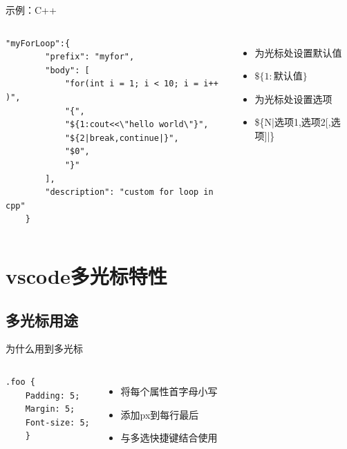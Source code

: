 \documentclass{beamer}
\begin{document}
\begin{frame}[fragile]{示例：C++}
    \begin{columns}

        \begin{lstlisting}[language=Tex,basicstyle=\tiny]
    "myForLoop":{
        "prefix": "myfor",
        "body": [
            "for(int i = 1; i < 10; i = i++ )",
            "{",
            "${1:cout<<\"hello world\"}",
            "${2|break,continue|}",
            "$0",
            "}"
        ],
        "description": "custom for loop in cpp"
    }
    \end{lstlisting}
        \begin{itemize}
            \item 为光标处设置默认值
            \item $\$\{1:\text{默认值}\}$
            \item 为光标处设置选项
            \item \$\{N|选项1,选项2[,选项]|\}
        \end{itemize}
    \end{columns}
\end{frame}

\section{vscode多光标特性}
\subsection{多光标用途}

\begin{frame}[fragile]{为什么用到多光标}
    \begin{columns}

        \begin{lstlisting}[language=Html,basicstyle=\small]
.foo {
    Padding: 5;
    Margin: 5;
    Font-size: 5;
    }
    \end{lstlisting}

        \begin{itemize}
            \item 将每个属性首字母小写
            \item 添加px到每行最后
            \item  {\color{red} 与多选快捷键结合使用}
        \end{itemize}

    \end{columns}
\end{frame}
\end{document}
